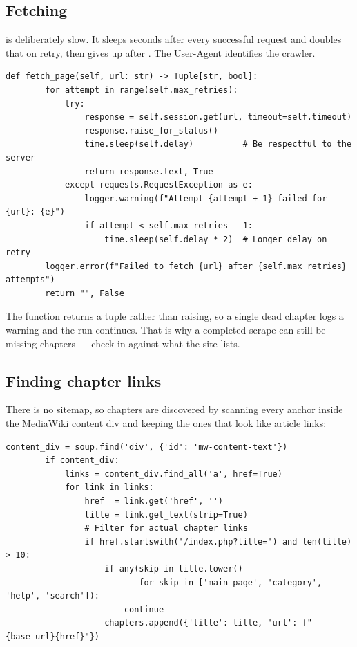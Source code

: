 \subsection{Fetching}

 is deliberately slow. It sleeps  seconds after every successful request and doubles that on retry, then gives up after . The User-Agent identifies the crawler.

\begin{lstlisting}[style=py,firstnumber=95]
    def fetch_page(self, url: str) -> Tuple[str, bool]:
        for attempt in range(self.max_retries):
            try:
                response = self.session.get(url, timeout=self.timeout)
                response.raise_for_status()
                time.sleep(self.delay)          # Be respectful to the server
                return response.text, True
            except requests.RequestException as e:
                logger.warning(f"Attempt {attempt + 1} failed for {url}: {e}")
                if attempt < self.max_retries - 1:
                    time.sleep(self.delay * 2)  # Longer delay on retry
        logger.error(f"Failed to fetch {url} after {self.max_retries} attempts")
        return "", False
\end{lstlisting}

The function returns a  tuple rather than raising, so a single dead chapter logs a warning and the run continues. That is why a completed scrape can still be missing chapters --- check  in  against what the site lists.

\subsection{Finding chapter links}

There is no sitemap, so chapters are discovered by scanning every anchor inside the MediaWiki content div and keeping the ones that look like article links:

\begin{lstlisting}[style=py,firstnumber=133]
        content_div = soup.find('div', {'id': 'mw-content-text'})
        if content_div:
            links = content_div.find_all('a', href=True)
            for link in links:
                href  = link.get('href', '')
                title = link.get_text(strip=True)
                # Filter for actual chapter links
                if href.startswith('/index.php?title=') and len(title) > 10:
                    if any(skip in title.lower()
                           for skip in ['main page', 'category', 'help', 'search']):
                        continue
                    chapters.append({'title': title, 'url': f"{base_url}{href}"})
\end{lstlisting}

